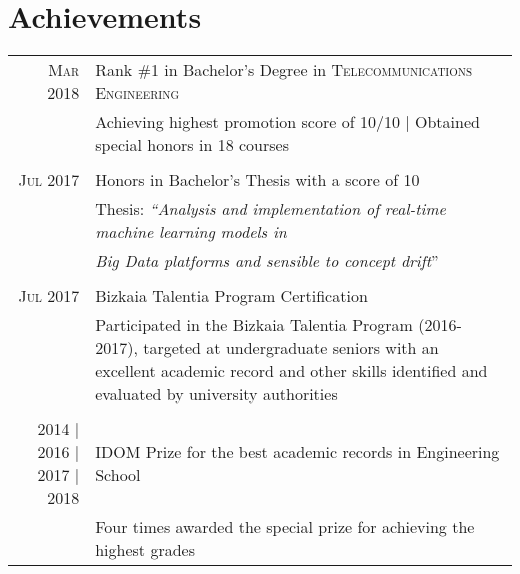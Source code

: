 \documentclass[a4paper,10pt]{article}
\begin{document}
\section{Achievements}
\begin{tabular}{rp{13.6cm}}
\textsc{Mar} 2018 & Rank \#1 in Bachelor's Degree in \textsc{Telecommunications Engineering} \\%
&\footnotesize{Achieving highest promotion score of 10/10 | Obtained special honors in 18 courses} \\&\\

\textsc{Jul} 2017 & Honors in Bachelor's Thesis with a score of 10 \\%
& \footnotesize{Thesis: \emph{``Analysis and implementation of real-time machine learning models in}} \\
& \footnotesize{ \hspace{10mm}\emph{ Big Data platforms and sensible to concept drift}'' }\\&\\

\textsc{Jul} 2017 & Bizkaia Talentia Program Certification \\%
& \footnotesize{Participated in the Bizkaia Talentia Program (2016-2017), targeted at undergraduate seniors \newline with an excellent academic record and other skills identified and evaluated by university authorities} \\&\\

2014 | 2016 | 2017 | 2018 & IDOM Prize for the best academic records in Engineering School\\%
&\footnotesize{ Four times awarded the special prize for achieving the highest grades} \\
\end{tabular}
\end{document}
